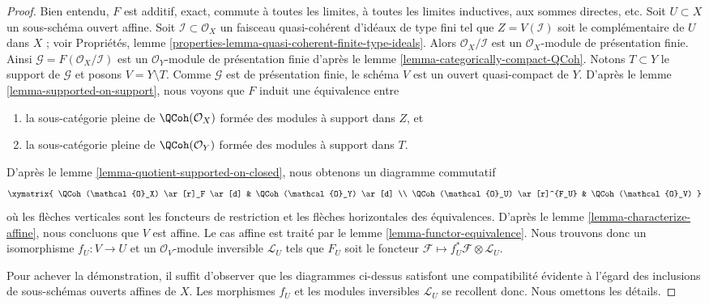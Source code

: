 \begin{proof}
Bien entendu, $F$ est additif, exact, commute à toutes les limites,
à toutes les limites inductives, aux sommes directes, etc.
Soit $U \subset X$ un sous-schéma ouvert affine.
Soit $\mathcal{I} \subset \mathcal{O}_X$ un faisceau quasi-cohérent
d'idéaux de type fini tel que $Z = V(\mathcal{I})$ soit le complémentaire
de $U$ dans $X$ ; voir Propriétés, lemme
\ref{properties-lemma-quasi-coherent-finite-type-ideals}.
Alors $\mathcal{O}_X/\mathcal{I}$ est un $\mathcal{O}_X$-module de
présentation finie. Ainsi $\mathcal{G} = F(\mathcal{O}_X/\mathcal{I})$
est un $\mathcal{O}_Y$-module de présentation finie d'après le
lemme \ref{lemma-categorically-compact-QCoh}.
Notons $T \subset Y$ le support de $\mathcal{G}$ et posons
$V = Y \setminus T$. Comme $\mathcal{G}$ est de présentation finie,
le schéma $V$ est un ouvert quasi-compact de $Y$.
D'après le lemme \ref{lemma-supported-on-support}, nous voyons que $F$ induit
une équivalence entre
\begin{enumerate}
\item la sous-catégorie pleine de $\QCoh(\mathcal{O}_X)$ formée des modules
à support dans $Z$, et
\item la sous-catégorie pleine de $\QCoh(\mathcal{O}_Y)$ formée des modules
à support dans $T$.
\end{enumerate}
D'après le lemme \ref{lemma-quotient-supported-on-closed}, nous obtenons un
diagramme commutatif
$$
\xymatrix{
\QCoh(\mathcal{O}_X) \ar[r]_F \ar[d] &
\QCoh(\mathcal{O}_Y) \ar[d] \\
\QCoh(\mathcal{O}_U) \ar[r]^{F_U} &
\QCoh(\mathcal{O}_V)
}
$$
où les flèches verticales sont les foncteurs de restriction et les flèches
horizontales des équivalences. D'après le lemme
\ref{lemma-characterize-affine}, nous concluons que $V$ est affine.
Le cas affine est traité par le lemme \ref{lemma-functor-equivalence}.
Nous trouvons donc un isomorphisme $f_U : V \to U$ et un
$\mathcal{O}_V$-module inversible $\mathcal{L}_U$ tels que
$F_U$ soit le foncteur
$\mathcal{F} \mapsto f_U^*\mathcal{F} \otimes \mathcal{L}_U$.

\medskip\noindent
Pour achever la démonstration, il suffit d'observer que les diagrammes
ci-dessus satisfont une compatibilité évidente à l'égard des inclusions de
sous-schémas ouverts affines de $X$. Les morphismes $f_U$ et les modules
inversibles $\mathcal{L}_U$ se recollent donc. Nous omettons les détails.
\end{proof}









